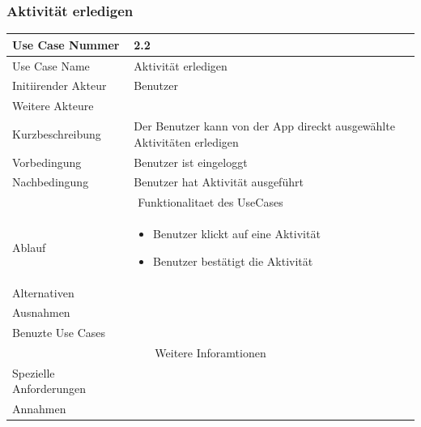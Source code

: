 \documentclass[10pt,a4paper]{article}
\begin{document}
\subsubsection{Aktivit\"at erledigen}
		\begin{tabular}{|l|p{.5\linewidth}|}
		\hline Use Case Nummer & 2.2 \\ 
		\hline Use Case Name & Aktivit\"at erledigen \\ 
		\hline Initiirender Akteur & Benutzer \\
		\hline Weitere Akteure &  \\
		\hline Kurzbeschreibung & Der Benutzer kann von der App direckt ausgew\"ahlte Aktivit\"aten erledigen \\
		\hline Vorbedingung & Benutzer ist eingeloggt \\
		\hline Nachbedingung & Benutzer hat Aktivit\"at ausgef\"uhrt \\
		\hline \multicolumn{2}{|c|}{Funktionalitaet des UseCases}\\
		\hline Ablauf & \begin{itemize}
			\item Benutzer klickt auf eine Aktivit\"at
			\item Benutzer best\"atigt die Aktivit\"at
		\end{itemize} \\
		\hline Alternativen &  \\
		\hline Ausnahmen &  \\
		\hline Benuzte Use Cases &  \\
		\hline \multicolumn{2}{|c|}{Weitere Inforamtionen} \\
		\hline Spezielle Anforderungen &  \\
		\hline Annahmen &  \\
		\hline
		\end{tabular}
\end{document}
